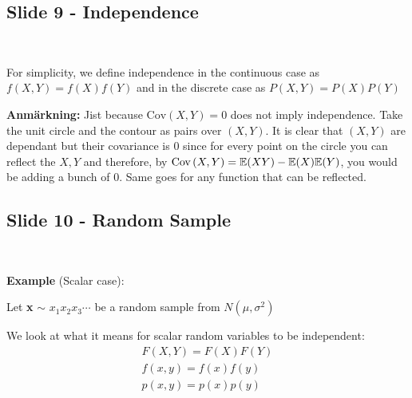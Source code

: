 \subsection{Slide 9 - Independence}\hfill\\
\par\bigskip
\noindent For simplicity, we define independence in the continuous case as $f(X,Y) = f(X)f(Y)$ and in the discrete case as $P(X,Y) = P(X)P(Y)$
\par\bigskip
\noindent\textbf{Anmärkning:} Jist because $\text{Cov}\left(X,Y\right)=0$ does not imply independence. Take the unit circle and the contour as pairs over $(X,Y)$. It is clear that $(X,Y)$ are dependant but their covariance is 0 since for every point on the circle you can reflect the $X,Y$ and therefore, by $\text{Cov}\left(X,Y\right) = \mathbb{E}(XY)-\mathbb{E}(X)\mathbb{E}(Y)$, you would be adding a bunch of 0. Same goes for any function that can be reflected.
\par\bigskip
\subsection{Slide 10 - Random Sample}\hfill\\
\par\bigskip
\noindent \textbf{Example} (Scalar case):\par
\noindent Let \textbf{x} $\sim$ \textbf{$x_1 x_2 x_3 \cdots$} be a random sample from $N(\mu,\sigma^2)$
\par\bigskip
\noindent We look at what it means for scalar random variables to be independent:
\begin{equation*}
  \begin{gathered}
    F(X,Y) = F(X)F(Y)\\
    f(x,y) = f(x)f(y)\\
    p(x,y) = p(x)p(y)
  \end{gathered}
\end{equation*}
